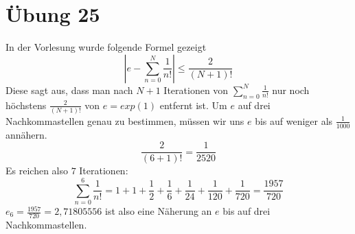 \documentclass[a4paper,10pt]{article}
\begin{document}
\section*{Übung 25}

In der Vorlesung wurde folgende Formel gezeigt
\begin{equation}
 |e - \sum_{n = 0}^N \frac{1}{n!}| \le \frac{2}{(N + 1)!}
\end{equation}
Diese sagt aus, dass man nach $N + 1$ Iterationen von $\sum_{n = 0}^N \frac{1}{n!}$ nur noch höchstens $\frac{2}{(N + 1)!}$ von $e = exp(1)$ entfernt ist.
Um $e$ auf drei Nachkommastellen genau zu bestimmen, müssen wir uns $e$ bis auf weniger als $\frac{1}{1000}$ annähern.
\begin{equation}
 \frac{2}{(6 + 1)!} = \frac{1}{2520}
\end{equation}
Es reichen also $7$ Iterationen:
\begin{equation}
 \sum_{n = 0}^6 \frac{1}{n!} = 1 + 1 + \frac{1}{2} + \frac{1}{6} + \frac{1}{24} + \frac{1}{120} + \frac{1}{720} = \frac{1957}{720}
\end{equation}
$e_6 = \frac{1957}{720} = 2,71805556$ ist also eine Näherung an $e$ bis auf drei Nachkommastellen.
\end{document}
